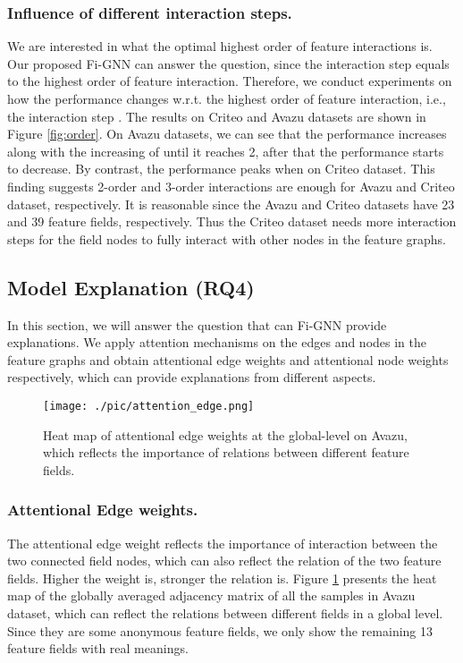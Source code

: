\documentclass[sigconf]{acmart}
\begin{document}
\subsubsection{\textbf{Influence of different interaction steps.}}
We are interested in what the optimal highest order of feature interactions is.  
Our proposed Fi-GNN can answer the question, since the interaction step  equals to the highest order of feature interaction.
Therefore, we conduct experiments on how the performance changes w.r.t. the highest order of feature interaction, i.e., the interaction step .
The results on Criteo and Avazu datasets are shown in Figure \ref{fig:order}.
On Avazu datasets, we can see that the performance increases along with the increasing of  until it reaches 2, after that the performance starts to decrease.
By contrast, the performance peaks when  on Criteo dataset.
This finding suggests 2-order and 3-order interactions are enough for Avazu and Criteo dataset, respectively.
It is reasonable since the Avazu and Criteo datasets have 23 and 39 feature fields, respectively.
Thus the Criteo dataset needs more interaction steps for the field nodes to fully interact with other nodes in the feature graphs.



\subsection{Model Explanation (RQ4)} \label{sect:explannation}
In this section, we will answer the question that can Fi-GNN provide explanations.
We apply attention mechanisms on the edges and nodes in the feature graphs and obtain attentional edge weights and attentional node weights respectively, which can provide explanations from different aspects.

\begin{figure}[t]
\centering
\texttt{[image: ./pic/attention\_edge.png]}
\caption{Heat map of attentional edge weights at the global-level on Avazu, which reflects the importance of relations between different feature fields.}
\label{fig:heatmap_edge}
\end{figure}

\subsubsection{\textbf{Attentional Edge weights.}}
The attentional edge weight reflects the importance of interaction between the two connected field nodes, which can also reflect the relation of the two feature fields.
Higher the weight is, stronger the relation is.
Figure \ref{fig:heatmap_edge} presents the heat map of the globally averaged adjacency matrix of all the samples in Avazu dataset, which can reflect the relations between different fields in a global level. 
Since they are some anonymous feature fields, we only show the remaining 13 feature fields with real meanings.
\end{document}
